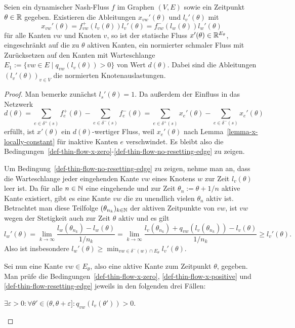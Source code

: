 \begin{theorem}
	Seien ein dynamischer Nash-Fluss $f$ im Graphen $(V,E)$ sowie ein Zeitpunkt $\theta\in\mathbb{R}$ gegeben.
	Existieren die Ableitungen $x_{vw}'(\theta)$ und $l_v'(\theta)$ mit 
	\[
	x_{vw}'(\theta) = f_{vw}^+(l_v(\theta)) l_v'(\theta)= f_{vw}^-(l_w(\theta))l_w'(\theta)
	\]
	für alle Kanten $vw$ und Knoten $v$, so ist der statische Fluss $x'(\theta) \in \mathbb{R}^{E_\theta}$, eingeschränkt auf die zu $\theta$ aktiven Kanten, ein normierter schmaler Fluss mit Zurück\-setzen auf den Kanten mit Warteschlange $E_1:=\{vw\in E \mid q_{vw}(l_v(\theta))>0 \}$ von Wert $d(\theta)$.
	Dabei sind die Ableitungen $(l_v'(\theta))_{v\in V}$ die normierten Knotenauslastungen.
\end{theorem}
\begin{proof}
	Man bemerke zunächst $l_s'(\theta) = 1$.
	Da außerdem der Einfluss in das Netzwerk 
	\[
	d(\theta)=  \sum_{e\in \delta^+(s)} f_e^+(\theta) - \sum_{e\in\delta^-(s)} f_e^-(\theta) = \sum_{e\in \delta^+(s)} x_e'(\theta) - \sum_{e\in\delta^-(s)} x_e'(\theta)
	\]
	erfüllt, ist $x'(\theta)$ ein $d(\theta)$-wertiger Fluss, weil $x_e'(\theta)$ nach Lemma~\ref{lemma-x-locally-constant} für inaktive Kanten $e$ verschwindet. Es bleibt also die Bedingungen~\ref{def-thin-flow-x-zero}-\ref{def-thin-flow-no-resetting-edge} zu zeigen.
	
	Um Bedingung~\ref{def-thin-flow-no-resetting-edge} zu zeigen,
	nehme man an, dass die Warteschlange jeder eingehenden Kante $vw$ eines Knotens $w$ zur Zeit $l_v(\theta)$ leer ist.
	Da für alle $n\in\mathbb{N}$ eine eingehende und zur Zeit $\theta_n := \theta + 1/n$ aktive Kante existiert, gibt es eine Kante $vw$ die zu unendlich vielen $\theta_n$ aktiv ist.
	Betrachtet man diese Teilfolge $(\theta_{n_k})_{k\in\mathbb{N}}$ der aktiven Zeitpunkte von $vw$, ist $vw$ wegen der Stetigkeit auch zur Zeit $\theta$ aktiv und es gilt 
	\[
	l_w'(\theta) = \lim_{k\to\infty} \frac{l_w(\theta_{n_k})- l_w(\theta)}{1/n_k} = \lim_{k\to\infty} \frac{ l_v(\theta_{n_k}) + q_{vw}(l_v(\theta_{n_k})) - l_v(\theta) }{1/n_k} \geq l_v'(\theta).
	\]
	Also ist insbesondere $l_w'(\theta) \geq \min_{vw\in \delta^-(w)\cap E_\theta} l_v'(\theta)$.
	
	Sei nun eine Kante $vw\in E_\theta$, also eine aktive Kante zum Zeitpunkt $\theta$, gegeben. Man prüfe die Bedingungen~\ref{def-thin-flow-x-zero}, \ref{def-thin-flow-x-positive} und \ref{def-thin-flow-resetting-edge} jeweils in den folgenden drei Fällen:
	
	\begin{description}[leftmargin=0cm, topsep=0cm, itemindent=0.5cm]
		\item[1. Fall:] $\exists \varepsilon > 0:\forall \theta'\in (\theta, \theta + \varepsilon ] : q_{vw}(l_v(\theta')) > 0$.
		

\end{description}
\end{proof}
